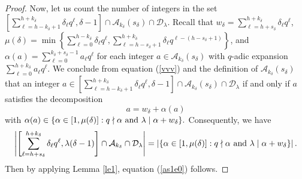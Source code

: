 \documentclass[journal,onecolumn]{IEEEtran}
\begin{document}
\begin{proof}
Now, let us count the number of integers in the set $\left[\sum\limits_{\ell=h-k_{\delta}+1}^{h+k_{\delta}}\delta_{\ell}q^{\ell},\delta-1\right]\cap \mathcal{A}_{k_{\delta}}(s_{\delta})\cap \mathcal{D}_{\lambda}.$
    Recall that $w_{\delta}= \sum\limits_{\ell=h+s_{\delta}}^{h+k_{\delta}}\delta_{\ell}q^{\ell}$, $\mu(\delta)=\min\left \{\sum\limits_{\ell=0}^{h-k_{\delta}}\delta_{\ell}q^{\ell}, \sum\limits_{\ell=h-s_{\delta}+1}^{h+k_{\delta}}\delta_{\ell}q^{\ell-(h-s_{\delta}+1)}  \right\}$, and $\alpha(a)=\sum\limits_{\ell=0}^{k_{\delta}+s_{\delta}-1}a_{\ell}q^{\ell}$  for each integer $a\in \mathcal{A}_{k_{\delta}}(s_{\delta})$ with $q$-adic expansion $\sum\limits_{\ell=0}^{h+k_{\delta}}a_{\ell}q^{\ell}$. 
 We conclude from equation (\ref{vvv}) and  the definition of $\mathcal{A}_{k_{\delta}}(s_{\delta})$  that an integer  $a\in \left[\sum\limits_{\ell=h-k_{\delta}+1}^{h+k_{\delta}}\delta_{\ell}q^{\ell},\delta-1\right]\cap \mathcal{A}_{k_{\delta}}(s_{\delta})\cap \mathcal{D}_{\lambda}$ if and only if $a$ satisfies the decomposition 
\begin{equation*}a=w_{\delta}+\alpha(a)\end{equation*}
with $   \alpha(a) \in \{ \alpha\in \left[1,    \mu(\delta)\right]: q\nmid \alpha \hbox{ and }\lambda\mid \alpha+w_{\delta}\}. 
$
Consequently, we have 
\begin{equation}\notag  \left|\left[\sum\limits_{\ell=h+s_{\delta}}^{h+k_{\delta}}\delta_{\ell}q^{\ell}, \lambda(\delta-1)\right]\cap \mathcal{A}_{k_{\delta}}\cap \mathcal{D}_{\lambda}\right| = 
   \left| \{\alpha\in \left[1,\mu(\delta)\right]: q\nmid \alpha \hbox{ and } \lambda \mid \alpha+w_{\delta} \}\right|.
\end{equation} 
Then by applying Lemma \ref{le1}, equation  (\ref{as1e0}) follows.
 


\end{proof}
\end{document}
